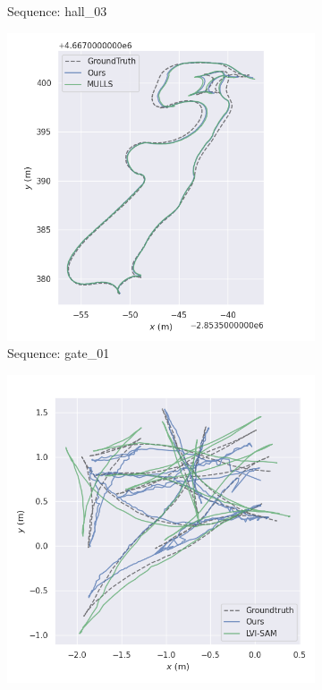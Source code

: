 \begin{figure}
\begin{subfigure}{0.24\linewidth}
    \caption{Sequence: hall\_03}
    \label{fig:hall_vs_base}
  \end{subfigure}
  \begin{subfigure}{0.24\linewidth}
    \centering
    \includegraphics[width=\linewidth]{images/gate_01_trajectories.png}
    \caption{Sequence: gate\_01}
    \label{fig:gate_vs_base}
  \end{subfigure}
  \begin{subfigure}{0.24\linewidth}
    \centering
    \includegraphics[width=\linewidth]{images/vs_LVI.png}

\end{subfigure}
\end{figure}
